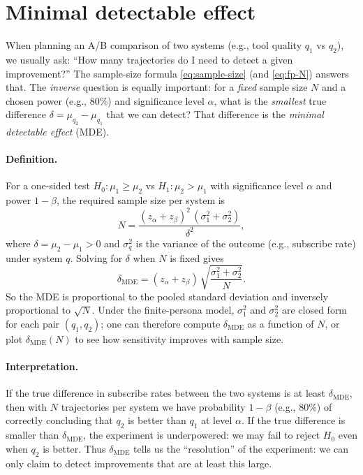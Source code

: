 \section{Minimal detectable effect}
\label{sec:mde}

When planning an A/B comparison of two systems (e.g., tool quality $q_1$ vs $q_2$), we usually ask: ``How many trajectories do I need to detect a given improvement?'' The sample-size formula \eqref{eq:sample-size} (and \eqref{eq:fp-N}) answers that. The \emph{inverse} question is equally important: for a \emph{fixed} sample size $N$ and a chosen power (e.g., 80\%) and significance level $\alpha$, what is the \emph{smallest} true difference $\delta = \mu_{q_2} - \mu_{q_1}$ that we can detect? That difference is the \emph{minimal detectable effect} (MDE).

\paragraph{Definition.}
For a one-sided test $H_0: \mu_1 \geq \mu_2$ vs $H_1: \mu_2 > \mu_1$ with significance level $\alpha$ and power $1 - \beta$, the required sample size per system is
\begin{equation}
  N = \frac{(z_\alpha + z_\beta)^2\, (\sigma_1^2 + \sigma_2^2)}{\delta^2},
\end{equation}
where $\delta = \mu_2 - \mu_1 > 0$ and $\sigma_q^2$ is the variance of the outcome (e.g., subscribe rate) under system $q$. Solving for $\delta$ when $N$ is fixed gives
\begin{equation}
  \delta_{\mathrm{MDE}} = (z_\alpha + z_\beta)\, \sqrt{\frac{\sigma_1^2 + \sigma_2^2}{N}}. \label{eq:mde}
\end{equation}
So the MDE is proportional to the pooled standard deviation and inversely proportional to $\sqrt{N}$. Under the finite-persona model, $\sigma_1^2$ and $\sigma_2^2$ are closed form for each pair $(q_1, q_2)$; one can therefore compute $\delta_{\mathrm{MDE}}$ as a function of $N$, or plot $\delta_{\mathrm{MDE}}(N)$ to see how sensitivity improves with sample size.

\paragraph{Interpretation.}
If the true difference in subscribe rates between the two systems is at least $\delta_{\mathrm{MDE}}$, then with $N$ trajectories per system we have probability $1 - \beta$ (e.g., 80\%) of correctly concluding that $q_2$ is better than $q_1$ at level $\alpha$. If the true difference is smaller than $\delta_{\mathrm{MDE}}$, the experiment is underpowered: we may fail to reject $H_0$ even when $q_2$ is better. Thus $\delta_{\mathrm{MDE}}$ tells us the ``resolution'' of the experiment: we can only claim to detect improvements that are at least this large.

